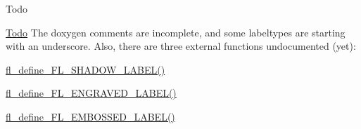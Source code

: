 \begin{DoxyRefDesc}{Todo}
\item[\hyperlink{todo__todo000004}{Todo}]The doxygen comments are incomplete, and some labeltypes are starting with an underscore. Also, there are three external functions undocumented (yet)\+:
\begin{DoxyItemize}
\item \hyperlink{_enumerations_8_h_acceca4e5fa60fae68ee0098bd9f44124}{fl\+\_\+define\+\_\+\+F\+L\+\_\+\+S\+H\+A\+D\+O\+W\+\_\+\+L\+A\+B\+E\+L()}
\item \hyperlink{_enumerations_8_h_ad2356471e464dcdc818929365be0781e}{fl\+\_\+define\+\_\+\+F\+L\+\_\+\+E\+N\+G\+R\+A\+V\+E\+D\+\_\+\+L\+A\+B\+E\+L()}
\item \hyperlink{_enumerations_8_h_a323a068ca36b789472bfb8e50e155b93}{fl\+\_\+define\+\_\+\+F\+L\+\_\+\+E\+M\+B\+O\+S\+S\+E\+D\+\_\+\+L\+A\+B\+E\+L()} 
\end{DoxyItemize}\end{DoxyRefDesc}
